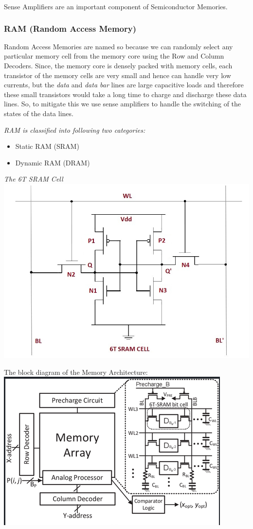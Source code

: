 \documentclass[12pt, letterpaper]{article}
\begin{document}
Sense Amplifiers are an important component of Semiconductor Memories.

\subsubsection{RAM (Random Access Memory)}
Random Access Memories are named so because we can randomly select any particular memory cell from the memory core using the Row and Column Decoders.
Since, the memory core is densely packed with memory cells, each transistor of the memory cells are very small and hence can handle very low currents, but the \textit{data} and \textit{data bar} lines are large capacitive loads and therefore these small transistors would take a long time to charge and discharge these data lines. So, to mitigate this we use sense amplifiers to handle the switching of the states of the data lines.

\emph{RAM is classified into following two categories:}
\begin{itemize}
    \item Static RAM (SRAM)
    \item Dynamic RAM (DRAM)
\end{itemize}

\emph{The 6T SRAM Cell} \\
\includegraphics [scale=0.5]{sram-cell}

The block diagram of the Memory Architecture: \\
\includegraphics[scale=0.7]{det_mem_arch}

 
\end{document}
